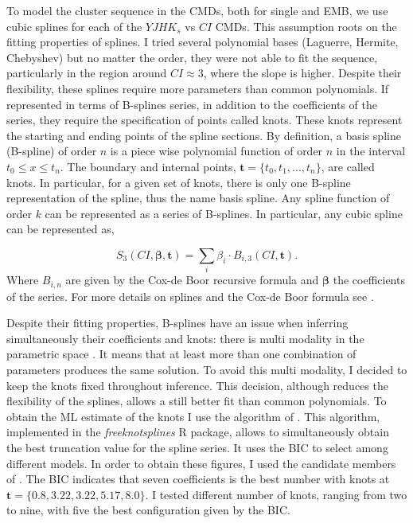 To model the cluster sequence in the CMDs, both for single and EMB, we use cubic splines for each of the $YJHK_s$ vs $CI$ CMDs. This assumption roots on the fitting properties of splines. I tried several polynomial bases (Laguerre, Hermite, Chebyshev) but no matter the order, they were not able to fit the sequence, particularly in the region around $CI \approx 3$, where the slope is higher. Despite their flexibility, these splines require more parameters than common polynomials. If represented in terms of B-splines series, in addition to the coefficients of the series, they require the specification of points called knots. These knots represent the starting and ending points of the spline sections. By definition, a basis spline (B-spline) of order $n$ is a piece wise polynomial function of order $n$ in the interval $t_0 \leq x \leq t_n$. The boundary and internal points, $\mathbf{t}=\{t_0,t_1,...,t_n\}$, are called knots. In particular, for a given set of knots, there is only one B-spline representation of the spline, thus the name basis spline. Any spline function of order $k$ can be represented as a series of B-splines. In particular, any cubic spline can be represented as,

\begin{equation}
S_3(CI,\boldsymbol{\beta},\mathbf{t}) = \sum_i \beta_i\cdot B_{i,3}(CI,\mathbf{t}).
\end{equation}
Where $B_{i,n}$ are given by the Cox-de Boor recursive formula and $\boldsymbol{\beta}$ the coefficients of the series. For more details on splines and the Cox-de Boor formula see \citet{deBoor1978}.



Despite their fitting properties, B-splines have an issue when inferring simultaneously their coefficients and knots: there is multi modality in the parametric space \citep{Lindstrom1999}. It means that at least more than one combination of parameters produces the same solution. To avoid this multi modality, I decided to keep the knots fixed throughout inference. This decision, although reduces the flexibility of the splines, allows a still better fit than common polynomials. To obtain the ML estimate of the knots I use the algorithm of  \citet{Spiriti2013}. This algorithm, implemented in the \emph{freeknotsplines} R package, allows to simultaneously obtain the best truncation value for the spline series. It uses the BIC to select among different models. In order to obtain these figures, I used the candidate members of \citet{Bouy2015}. The BIC indicates that seven coefficients is the best number with knots at $\mathbf{t}=\{0.8,3.22,3.22,5.17,8.0\}$. I tested different number of knots, ranging from two to nine, with five the best configuration given by the BIC. 

